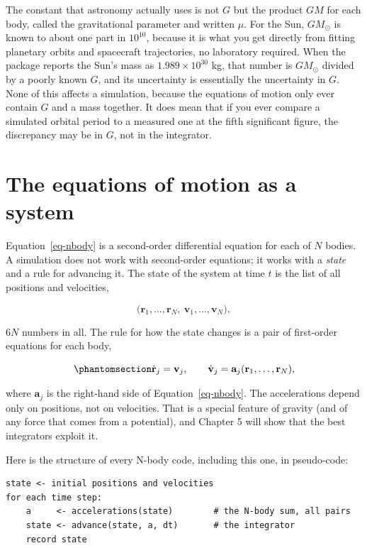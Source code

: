 \documentclass[
  10.5pt,
  letterpaper,
]{scrbook}
\theoremstyle{definition}
\theoremstyle{plain}
\theoremstyle{remark}
\begin{document}
The constant that astronomy actually uses is not \(G\) but the product
\(GM\) for each body, called the gravitational parameter and written
\(\mu\). For the Sun, \(GM_\odot\) is known to about one part in
\(10^{10}\), because it is what you get directly from fitting planetary
orbits and spacecraft trajectories, no laboratory required. When the
package reports the Sun's mass as \(1.989\times10^{30}\) kg, that number
is \(GM_\odot\) divided by a poorly known \(G\), and its uncertainty is
essentially the uncertainty in \(G\). None of this affects a simulation,
because the equations of motion only ever contain \(G\) and a mass
together. It does mean that if you ever compare a simulated orbital
period to a measured one at the fifth significant figure, the
discrepancy may be in \(G\), not in the integrator.

\section{The equations of motion as a
system}\label{the-equations-of-motion-as-a-system}

Equation~\ref{eq-nbody} is a second-order differential equation for each
of \(N\) bodies. A simulation does not work with second-order equations;
it works with a \emph{state} and a rule for advancing it. The state of
the system at time \(t\) is the list of all positions and velocities,

\[
\big(\mathbf{r}_1, \ldots, \mathbf{r}_N,\ \mathbf{v}_1, \ldots, \mathbf{v}_N\big),
\]

\(6N\) numbers in all. The rule for how the state changes is a pair of
first-order equations for each body,

\begin{equation}\protect\phantomsection\label{eq-state}{
\dot{\mathbf{r}}_j = \mathbf{v}_j, \qquad
\dot{\mathbf{v}}_j = \mathbf{a}_j(\mathbf{r}_1, \ldots, \mathbf{r}_N),
}\end{equation}

where \(\mathbf{a}_j\) is the right-hand side of
Equation~\ref{eq-nbody}. The accelerations depend only on positions, not
on velocities. That is a special feature of gravity (and of any force
that comes from a potential), and Chapter 5 will show that the best
integrators exploit it.

Here is the structure of every N-body code, including this one, in
pseudo-code:

\begin{verbatim}
state <- initial positions and velocities
for each time step:
    a     <- accelerations(state)        # the N-body sum, all pairs
    state <- advance(state, a, dt)       # the integrator
    record state
\end{verbatim}
\end{document}

